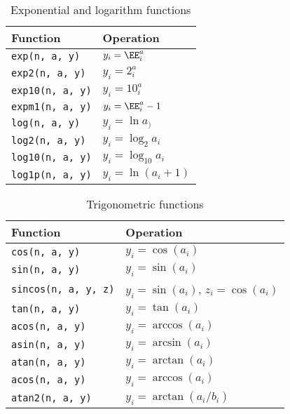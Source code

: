 \begin{table}
  \begin{tabularx}{\textwidth}{XX}
    \toprule
    Function & Operation \\
    \midrule
    \verb|exp(n, a, y)|   & $y_i = \EE^a_i$       \\
    \verb|exp2(n, a, y)|  & $y_i = 2^a_i$         \\
    \verb|exp10(n, a, y)| & $y_i = 10^a_i$        \\
    \verb|expm1(n, a, y)| & $y_i = \EE^a_i - 1$   \\
    \verb|log(n, a, y)|   & $y_i = \ln a_)$       \\
    \verb|log2(n, a, y)|  & $y_i = \log_2 a_i$    \\
    \verb|log10(n, a, y)| & $y_i = \log_{10} a_i$ \\
    \verb|log1p(n, a, y)| & $y_i = \ln(a_i + 1)$  \\
    \bottomrule
  \end{tabularx}
  \caption{Exponential and logarithm functions}
  \label{tab:Exponential and logarithm functions}
\end{table}

\begin{table}
  \begin{tabularx}{\textwidth}{XX}
    \toprule
    Function & Operation \\
    \midrule
    \verb|cos(n, a, y)|       & $y_i = \cos(a_i)$                    \\
    \verb|sin(n, a, y)|       & $y_i = \sin(a_i)$                    \\
    \verb|sincos(n, a, y, z)| & $y_i = \sin(a_i)$, $z_i = \cos(a_i)$ \\
    \verb|tan(n, a, y)|       & $y_i = \tan(a_i)$                    \\
    \verb|acos(n, a, y)|      & $y_i = \arccos(a_i)$                 \\
    \verb|asin(n, a, y)|      & $y_i = \arcsin(a_i)$                 \\
    \verb|atan(n, a, y)|      & $y_i = \arctan(a_i)$                 \\
    \verb|acos(n, a, y)|      & $y_i = \arccos(a_i)$                 \\
    \verb|atan2(n, a, y)|     & $y_i = \arctan(a_i / b_i)$           \\
    \bottomrule
  \end{tabularx}
  \caption{Trigonometric functions}
  \label{tab:Trigonometric functions}
\end{table}

